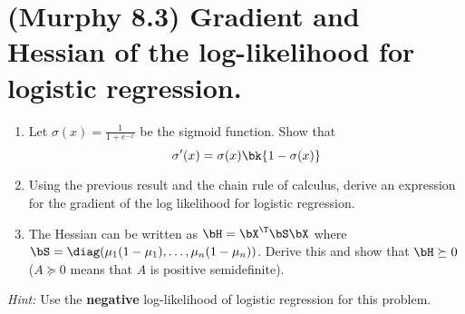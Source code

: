 \documentclass[189]{pset}
\begin{document}

  \section{(Murphy 8.3) Gradient and Hessian of the log-likelihood for
    logistic regression.}

    \begin{enumerate}
      \item Let $\sigma(x) = \frac{1}{1 + e^{-x}}$ be the sigmoid
        function. Show that
        \[
          \sigma'(x) = \sigma(x)\bk{1 - \sigma(x)}
        \]
      \item Using the previous result and the chain rule of calculus,
        derive an expression for the gradient of the log likelihood
        for logistic regression.
      \item The Hessian can be written as $\bH=\bX^\T\bS\bX$ where
        $\bS = \diag(\mu_1(1-\mu_1), \dots, \mu_n(1-\mu_n))$. Derive
        this and show that $\bH \succeq 0$ ($A \succeq 0$ means that
        $A$ is positive semidefinite).
    \end{enumerate}

    \textit{Hint:} Use the \textbf{negative} log-likelihood of
    logistic regression for this problem.

  \hrulefill
\end{document}

